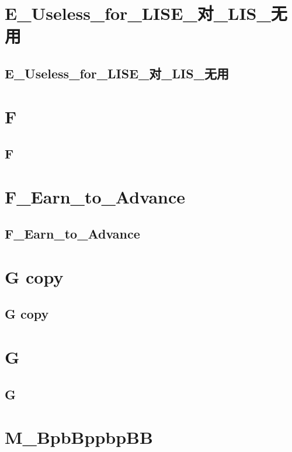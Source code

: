 \section{E\_Useless\_for\_LISE\_对\_LIS\_无用}
\subsection{E\_Useless\_for\_LISE\_对\_LIS\_无用}
\raggedbottom
\hrulefill

\section{F}
\subsection{F}
\raggedbottom
\hrulefill

\section{F\_Earn\_to\_Advance}
\subsection{F\_Earn\_to\_Advance}
\raggedbottom
\hrulefill

\section{G copy}
\subsection{G copy}
\raggedbottom
\hrulefill

\section{G}
\subsection{G}
\raggedbottom
\hrulefill

\section{M\_BpbBppbpBB}
